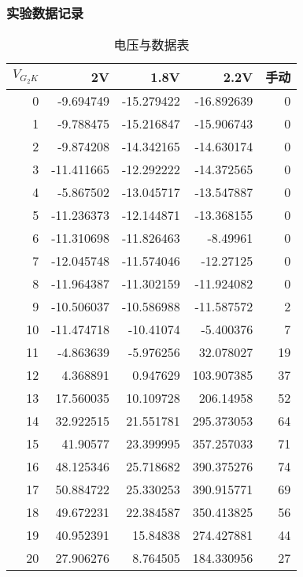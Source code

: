 \documentclass[dvipsnames, svgnames,a4paper,11pt]{article}
\begin{document}
	
	\subsubsection{实验数据记录}
	
\begin{longtable}{|r|r|r|r|r|} %
	\caption{电压与数据表} \\ %
	\toprule

	
	
	
	$V_{G_2K}$ & 2V & 1.8V & 2.2V & 手动\\
	\midrule
	\endhead %
	0  & -9.694749  & -15.279422  & -16.892639  & 0   \\
	1  & -9.788475  & -15.216847  & -15.906743  & 0   \\
	2  & -9.874208  & -14.342165  & -14.630174  & 0   \\
	3  & -11.411665 & -12.292222  & -14.372565  & 0   \\
	4  & -5.867502  & -13.045717  & -13.547887  & 0   \\
	5  & -11.236373 & -12.144871  & -13.368155  & 0   \\
	6  & -11.310698 & -11.826463  & -8.49961   & 0   \\
	7  & -12.045748 & -11.574046  & -12.27125   & 0   \\
	8  & -11.964387 & -11.302159  & -11.924082  & 0   \\
	9  & -10.506037 & -10.586988  & -11.587572  & 2   \\
	10 & -11.474718 & -10.41074   & -5.400376  & 7   \\
	11 & -4.863639  & -5.976256   & 32.078027  & 19  \\
	12 & 4.368891   & 0.947629    & 103.907385 & 37  \\
	13 & 17.560035  & 10.109728   & 206.14958  & 52  \\
	14 & 32.922515  & 21.551781   & 295.373053 & 64  \\
	15 & 41.90577   & 23.399995   & 357.257033 & 71  \\
	16 & 48.125346  & 25.718682   & 390.375276 & 74  \\
	17 & 50.884722  & 25.330253   & 390.915771 & 69  \\
	18 & 49.672231  & 22.384587   & 350.413825 & 56  \\
	19 & 40.952391  & 15.84838    & 274.427881 & 44  \\
	20 & 27.906276  & 8.764505    & 184.330956 & 27  \\

\end{longtable}
\end{document}
